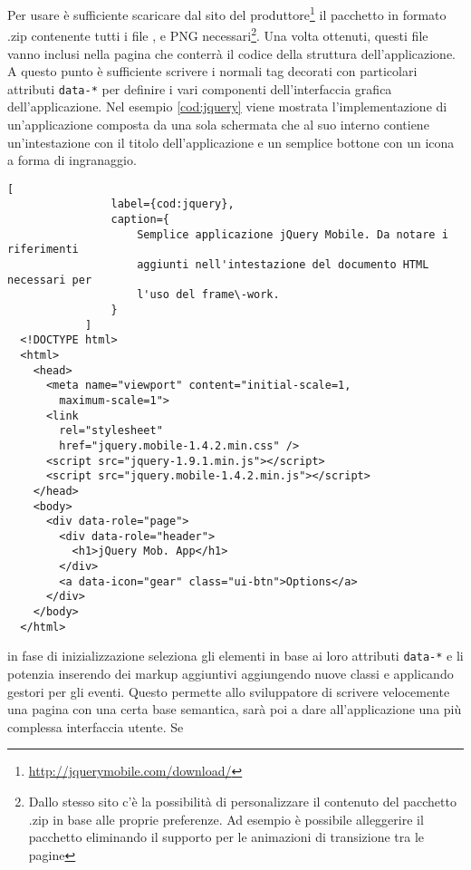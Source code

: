             Per usare \jqm{} è sufficiente scaricare dal sito del
            produttore\footnote{\url{http://jquerymobile.com/download/}} il
            pacchetto in formato .zip contenente tutti i file \js{}, \css{} e
            PNG necessari\footnote{Dallo stesso sito c'è la possibilità di
            personalizzare il contenuto del pacchetto .zip in base alle proprie
            preferenze. Ad esempio è possibile alleggerire il pacchetto
            eliminando il supporto per le animazioni di transizione tra le
            pagine}. Una volta ottenuti, questi file vanno inclusi nella pagina
            \html{} che conterrà il codice della struttura dell'applicazione. A
            questo punto è sufficiente scrivere i normali tag \html{} decorati con
            particolari attributi \verb|data-*| per definire i vari componenti
            dell'interfaccia grafica dell'applicazione. Nel esempio \ref{cod:jquery}
            viene mostrata l'implementazione di un'applicazione composta da
            una sola schermata che al suo interno contiene un'intestazione con
            il titolo dell'applicazione e un semplice bottone con un icona a
            forma di ingranaggio.\clearpage
            \begin{lstlisting}[
                label={cod:jquery},
                caption={
                    Semplice applicazione jQuery Mobile. Da notare i riferimenti
                    aggiunti nell'intestazione del documento HTML necessari per
                    l'uso del frame\-work.
                }
            ]
  <!DOCTYPE html>
  <html>
    <head>
      <meta name="viewport" content="initial-scale=1,
        maximum-scale=1">
      <link
        rel="stylesheet"
        href="jquery.mobile-1.4.2.min.css" />
      <script src="jquery-1.9.1.min.js"></script>
      <script src="jquery.mobile-1.4.2.min.js"></script>
    </head>
    <body>
      <div data-role="page">
        <div data-role="header">
          <h1>jQuery Mob. App</h1>
        </div>
        <a data-icon="gear" class="ui-btn">Options</a>
      </div>
    </body>
  </html>
            \end{lstlisting}
            \jqm{} in fase di inizializzazione seleziona gli elementi in
            base ai loro attributi \verb|data-*| e li potenzia inserendo dei markup
            aggiuntivi aggiungendo nuove classi \css{} e applicando gestori per gli
            eventi. Questo permette allo sviluppatore di scrivere velocemente
            una pagina con una certa base semantica, sarà poi \jqm{} a
            dare all'applicazione una più complessa interfaccia utente. Se
